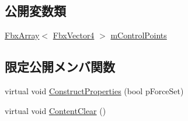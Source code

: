 \subsection*{公開変数類}
\begin{DoxyCompactItemize}
\item 
\hyperlink{class_fbx_array}{Fbx\+Array}$<$ \hyperlink{class_fbx_vector4}{Fbx\+Vector4} $>$ \hyperlink{class_fbx_geometry_base_a88c6c0552ceb07b3a638cc3175fbe867}{m\+Control\+Points}
\end{DoxyCompactItemize}
\subsection*{限定公開メンバ関数}
\begin{DoxyCompactItemize}
\item 
virtual void \hyperlink{class_fbx_geometry_base_a94ee142ac1d40be3aebb4d9441431921}{Construct\+Properties} (bool p\+Force\+Set)
\item 
virtual void \hyperlink{class_fbx_geometry_base_acf13ddd2717d2f1ca4dc57b5ea0801b1}{Content\+Clear} ()
\end{DoxyCompactItemize}
